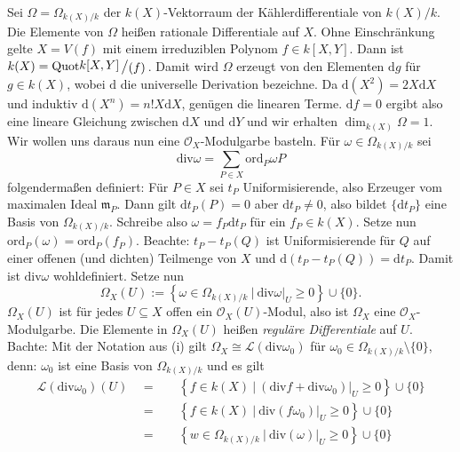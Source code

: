 \documentclass[11pt]{book}
\theoremstyle{nonumberbreak}
\newenvironment{ex}[1][]{\ifthenelse{\equal{#1}{}}{\example}{\example[#1]}\rm}{\endexample}
\newcommand{\slant}[2]{{\raisebox{.1em}{$#1$}\left/\raisebox{-.1em}{$#2$}\right.}}
\begin{document}
\begin{spacing}{1.4}
\begin{ex}
\begin{compactenum}
\item Sei $\Omega= \Omega_{k(X)/k}$ der $k(X)$-Vektorraum der Kählerdifferentiale von $k(X)/k$. Die Elemente von $\Omega$ heißen rationale Differentiale auf $X$. Ohne Einschränkung gelte $X=V(f)$ mit einem irreduziblen Polynom $f \in k[X,Y]$. Dann ist $k(X) = \textrm{Quot} \slant{k[X,Y]}{(f)}$. Damit wird $\Omega$ erzeugt von den Elementen $\textrm{d}g$ für $g \in k(X)$, wobei $\textrm{d}$ die universelle Derivation bezeichne. Da $\textrm{d}(X^2) = 2X \textrm{d}X$und induktiv $\textrm{d}(X^n) = n! X \textrm{d}X$, genügen die linearen Terme. $\textrm{d}f=0$ ergibt also eine lineare Gleichung zwischen $\textrm{d}X$ und $\textrm{d}Y$ und wir erhalten $\dim_{k(X)} \Omega =1$. Wir wollen uns daraus nun eine $\mathcal{O}_X$-Modulgarbe basteln. Für $ \omega \in \Omega_{k(X)/k}$ sei
$$\textrm{div} \omega = \sum_{P \in X} \mathrm{ord}_P \omega P$$
folgendermaßen definiert: Für $P \in X$ sei $t_P$ Uniformisierende, also Erzeuger vom maximalen Ideal $\mathfrak{m}_P$. Dann gilt $\textrm{d}t_P(P)=0$ aber $\textrm{d}t_P \neq 0$, also bildet $\{\textrm{d}t_P\}$ eine Basis von $\Omega_{k(X)/k}$. Schreibe also $\omega= f_P \textrm{d}t_P$ für ein $f_P \in k(X)$. Setze nun $\textrm{ord}_P(\omega) = \textrm{ord}_P(f_P)$. Beachte: $t_P - t_P(Q)$ ist Uniformisierende für $Q$ auf einer offenen (und dichten) Teilmenge von $X$ und $\textrm{d}(t_P-t_P(Q)) = \text{d}t_P$. Damit ist $\textrm{div} \omega$ wohldefiniert. Setze nun 
$$\Omega_X(U) := \left\{ \omega \in \Omega_{k(X)/k} \ \vert \ \text{div} \omega \vert_U \geqslant 0 \right\} \cup \{0\}.$$
$\Omega_X(U)$ ist für jedes $U \subseteq X$ offen ein $\mathcal{O}_X(U)$-Modul, also ist $\Omega_X$ eine $\mathcal{O}_X$-Modulgarbe. Die Elemente in $\Omega_X(U)$ heißen \textit{reguläre Differentiale} auf $U$. Bachte: Mit der Notation aus (i) gilt $\Omega_X \cong \mathcal{L}(\text{div} \omega_0)$ für $\omega_0 \in \Omega_{k(X)/k} \setminus \{0\}$, denn: $\omega_0$ ist eine Basis von $\Omega_{k(X)/k}$ und es gilt
\setlength{\abovedisplayskip}{5.5pt}
\setlength{\belowdisplayskip}{5.5pt}
\begin{alignat*}{5}
\mathcal{L}(\text{div} \omega_0)(U) \ \ &=&& \ \ \left\{ f \in k(X) \ \vert \ \left(\text{div} f + \text{div} \omega_0\right) \vert_U \geqslant 0 \right\} \cup \{0\} \\
&=&& \ \ \left\{ f \in k(X) \ \vert \ \text{div}(f \omega_0)\vert_U \geqslant 0 \right\} \cup \{0\} \\
&=&& \ \ \left\{ w \in \Omega_{k(X)/k} \ \vert \ \text{div}(\omega) \vert_U \geqslant 0 \right\} \cup\{0\} \\

\end{alignat*}
\end{compactenum}
\end{ex}
\end{spacing}
\end{document}

